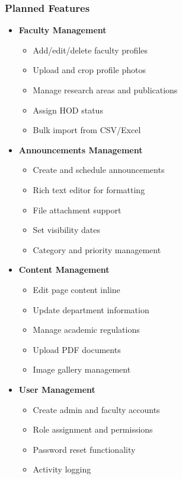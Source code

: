\documentclass[12pt,a4paper]{report}
\begin{document}
\subsubsection*{Planned Features}
\begin{itemize}
    \item \textbf{Faculty Management}
    \begin{itemize}
        \item Add/edit/delete faculty profiles
        \item Upload and crop profile photos
        \item Manage research areas and publications
        \item Assign HOD status
        \item Bulk import from CSV/Excel
    \end{itemize}
    
    \item \textbf{Announcements Management}
    \begin{itemize}
        \item Create and schedule announcements
        \item Rich text editor for formatting
        \item File attachment support
        \item Set visibility dates
        \item Category and priority management
    \end{itemize}
    
    \item \textbf{Content Management}
    \begin{itemize}
        \item Edit page content inline
        \item Update department information
        \item Manage academic regulations
        \item Upload PDF documents
        \item Image gallery management
    \end{itemize}
    
    \item \textbf{User Management}
    \begin{itemize}
        \item Create admin and faculty accounts
        \item Role assignment and permissions
        \item Password reset functionality
        \item Activity logging
    \end{itemize}
\end{itemize}
\end{document}
